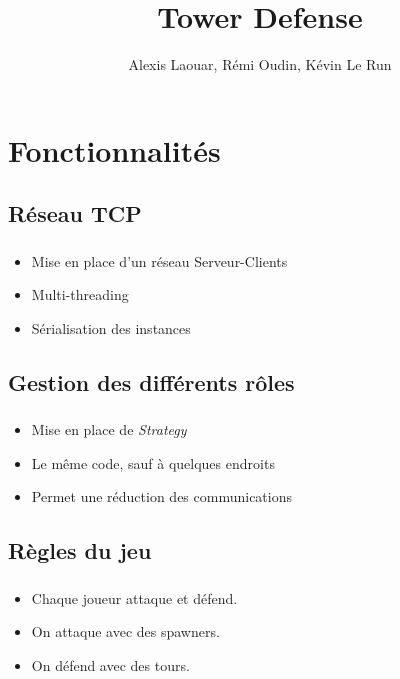 \documentclass[pdf]{beamer}
\title{Tower Defense}
\author{Alexis Laouar, R\'emi Oudin, K\'evin Le Run}
\begin{document}
\begin{frame}
  \titlepage
\end{frame}

\section{Fonctionnalit\'es}

\subsection{Réseau TCP}
\begin{frame}
    \frametitle{\subsecname}
    \begin{itemize}
        \item Mise en place d'un réseau Serveur-Clients
        \item Multi-threading
        \item Sérialisation des instances
    \end{itemize}
\end{frame}

\subsection{Gestion des différents rôles}
\begin{frame}
    \frametitle{\subsecname}
    \begin{itemize}
        \item Mise en place de \emph{Strategy}
        \item Le même code, sauf à quelques endroits
        \item Permet une réduction des communications
    \end{itemize}
\end{frame}

\subsection{Règles du jeu}
\begin{frame}
    \frametitle{\subsecname}
    \begin{itemize}
        \item Chaque joueur attaque et défend.
        \item On attaque avec des spawners.
        \item On défend avec des tours.
    \end{itemize}
\end{frame}
\end{document}
